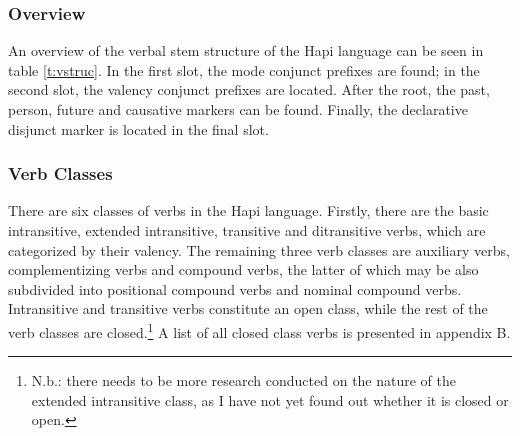 \documentclass[a4paper, 12pt, oneside]{memoir}
\begin{document}
\subsubsection{Overview}
An overview of the verbal stem structure of the Hapi language can be seen in table \ref{t:vstruc}. In the first slot, the mode conjunct prefixes are found; in the second slot, the valency conjunct prefixes are located. After the root, the past, person, future and causative markers can be found. Finally, the declarative disjunct marker is located in the final slot.
\begin{table}[p!]
    \centering
\caption{Verbal Stem Structure}
\label{t:vstruc}
\end{table}
\subsubsection{Verb Classes}\label{s:verbclass}
There are six classes of verbs in the Hapi language. Firstly, there are the basic intransitive, extended intransitive, transitive and ditransitive verbs, which are categorized by their valency. The remaining three verb classes are auxiliary verbs, complementizing verbs and compound verbs, the latter of which may be also subdivided into positional compound verbs and nominal compound verbs. Intransitive and transitive verbs constitute an open class, while the rest of the verb classes are closed.\footnote{N.b.: there needs to be more research conducted on the nature of the extended intransitive class, as I have not yet found out whether it is closed or open.} A list of all closed class verbs is presented in appendix B.
\end{document}
